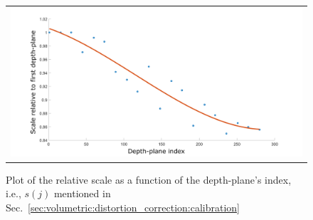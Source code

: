 \begin{figure} [ht]
\begin{center}
\begin{tabular}{c} 
\includegraphics[width=\textwidth]{images/volumetric/distortion_correction/scale_v_depth}
\end{tabular}
\end{center}
\label{fig:volumetric:distortion_correction:scale_v_depth} 
\caption{Plot of the relative scale as a function of the depth-plane's index, i.e., $s(j)$ mentioned in Sec.~\ref{sec:volumetric:distortion_correction:calibration}}
\end{figure} 
